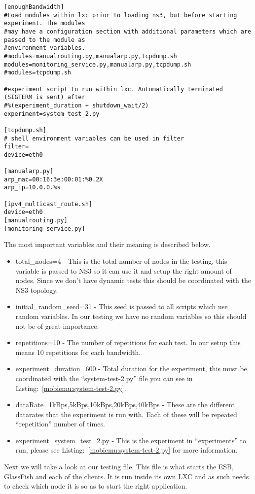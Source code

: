 \begin{lstlisting}[frame=single, caption={Setting.cfg}, label=mobiemu:setting.cfg, breaklines=true]
[enoughBandwidth]
#Load modules within lxc prior to loading ns3, but before starting experiment. The modules
#may have a configuration section with additional parameters which are passed to the module as
#environment variables.
#modules=manualrouting.py,manualarp.py,tcpdump.sh
modules=monitoring_service.py,manualarp.py,tcpdump.sh
#modules=tcpdump.sh

#experiment script to run within lxc. Automatically terminated (SIGTERM is sent) after
#%(experiment_duration + shutdown_wait/2)
experiment=system_test_2.py

[tcpdump.sh]
# shell environment variables can be used in filter
filter=
device=eth0

[manualarp.py]
arp_mac=00:16:3e:00:01:%0.2X
arp_ip=10.0.0.%s

[ipv4_multicast_route.sh]
device=eth0
[manualrouting.py]
[monitoring_service.py]
\end{lstlisting}

The most important variables and their meaning is described below.

\begin{itemize}
\item total\_nodes=4 - This is the total number of nodes in the testing, this variable is passed to NS3 so it can use it and setup the right amount of nodes. Since we don’t have dynamic tests this should be coordinated with the NS3 topology.
\item initial\_random\_seed=31 - This seed is passed to all scripts which use random variables. In our testing we have no random variables so this should not be of great importance.
\item repetitions=10 - The number of repetitions for each test. In our setup this means 10 repetitions for each bandwidth.
\item experiment\_duration=600 - Total duration for the experiment, this must be coordinated with the “system-test-2.py” file you can see in Listing:~\ref{mobiemu:system-test-2.py}.
\item dataRate=1kBps,5kBps,10kBps,20kBps,40kBps - These are the different datarates that the experiment is run with. Each of these will be repeated “repetition” number of times.
\item experiment=system\_test\_2.py - This is the experiment in “experiments” to run, please see Listing:~\ref{mobiemu:system-test-2.py} for more information.
\end{itemize}

Next we will take a look at our testing file. This file is what starts the ESB, GlassFish and each of the clients. It is run inside its own LXC and as such needs to check which node it is so as to start the right application.

